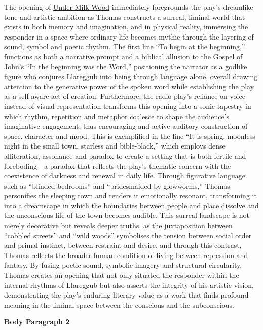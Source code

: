 		The opening of \underline{Under Milk Wood} immediately foregrounds the play’s dreamlike tone and artistic ambition as Thomas constructs a surreal, liminal world that exists in both memory and imagination, and in physical reality, immersing the responder in a space where ordinary life becomes mythic through the layering of sound, symbol and poetic rhythm. The first line “To begin at the beginning,” functions as both a narrative prompt and a biblical allusion to the Gospel of John’s “In the beginning was the Word,” positioning the narrator as a godlike figure who conjures Llareggub into being through language alone, overall drawing attention to the generative power of the spoken word while establishing the play as a self-aware act of creation. Furthermore, the radio play’s reliance on voice instead of visual representation transforms this opening into a sonic tapestry in which rhythm, repetition and metaphor coalesce to shape the audience’s imaginative engagement, thus encouraging and active auditory construction of space, character and mood. This is exemplified in the line “It is spring, moonless night in the small town, starless and bible-black,” which employs dense alliteration, assonance and paradox to create a setting that is both fertile and foreboding - a paradox that reflects the play’s thematic concern with the coexistence of darkness and renewal in daily life. Through figurative language such as “blinded bedrooms” and “bridesmaided by glowworms,” Thomas personifies the sleeping town and renders it emotionally resonant, transforming it into a dreamscape in which the boundaries between people and place dissolve and the unconscious life of the town becomes audible. This surreal landscape is not merely decorative but reveals deeper truths, as the juxtaposition between “cobbled streets” and “wild woods” symbolises the tension between social order and primal instinct, between restraint and desire, and through this contrast, Thomas reflects the broader human condition of living between repression and fantasy. By fusing poetic sound, symbolic imagery and structural circularity, Thomas creates an opening that not only situated the responder within the internal rhythms of Llareggub but also asserts the integrity of his artistic vision, demonstrating the play’s enduring literary value as a work that finds profound meaning in the liminal space between the conscious and the subconscious.

	\textbf{Body Paragraph 2}

